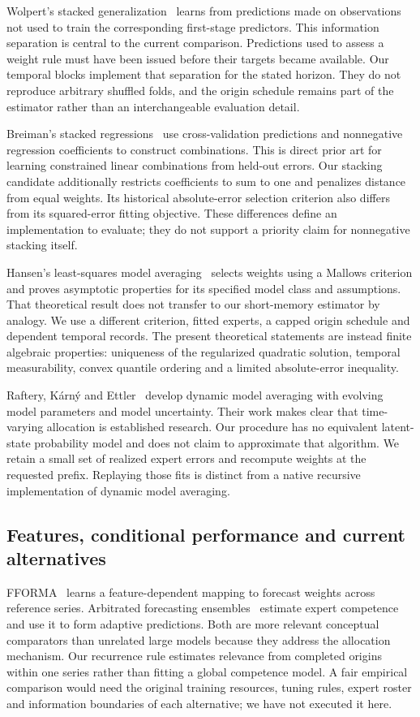 Wolpert's stacked generalization~\cite{wolpert} learns from predictions made on observations not used to train the corresponding first-stage predictors. This information separation is central to the current comparison. Predictions used to assess a weight rule must have been issued before their targets became available. Our temporal blocks implement that separation for the stated horizon. They do not reproduce arbitrary shuffled folds, and the origin schedule remains part of the estimator rather than an interchangeable evaluation detail.

Breiman's stacked regressions~\cite{breiman} use cross-validation predictions and nonnegative regression coefficients to construct combinations. This is direct prior art for learning constrained linear combinations from held-out errors. Our stacking candidate additionally restricts coefficients to sum to one and penalizes distance from equal weights. Its historical absolute-error selection criterion also differs from its squared-error fitting objective. These differences define an implementation to evaluate; they do not support a priority claim for nonnegative stacking itself.

Hansen's least-squares model averaging~\cite{hansen} selects weights using a Mallows criterion and proves asymptotic properties for its specified model class and assumptions. That theoretical result does not transfer to our short-memory estimator by analogy. We use a different criterion, fitted experts, a capped origin schedule and dependent temporal records. The present theoretical statements are instead finite algebraic properties: uniqueness of the regularized quadratic solution, temporal measurability, convex quantile ordering and a limited absolute-error inequality.

Raftery, K\'arn\'y and Ettler~\cite{dma} develop dynamic model averaging with evolving model parameters and model uncertainty. Their work makes clear that time-varying allocation is established research. Our procedure has no equivalent latent-state probability model and does not claim to approximate that algorithm. We retain a small set of realized expert errors and recompute weights at the requested prefix. Replaying those fits is distinct from a native recursive implementation of dynamic model averaging.

\subsection{Features, conditional performance and current alternatives}
FFORMA~\cite{fforma} learns a feature-dependent mapping to forecast weights across reference series. Arbitrated forecasting ensembles~\cite{ade} estimate expert competence and use it to form adaptive predictions. Both are more relevant conceptual comparators than unrelated large models because they address the allocation mechanism. Our recurrence rule estimates relevance from completed origins within one series rather than fitting a global competence model. A fair empirical comparison would need the original training resources, tuning rules, expert roster and information boundaries of each alternative; we have not executed it here.

